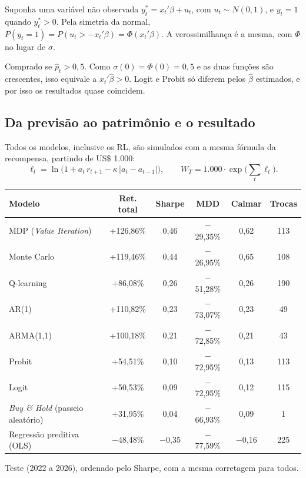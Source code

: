 \documentclass[11pt,a4paper]{article}
\newcommand{\bloco}[1]{\par\needspace{4\baselineskip}{\bfseries #1}\par\nopagebreak}
\begin{document}
\bloco{Probit}
Suponha uma variável não observada $y_t^* = x_t'\beta + u_t$, com $u_t \sim N(0,1)$, e $y_t = 1$ quando $y_t^* > 0$. Pela simetria da normal, $P(y_t = 1) = P(u_t > -x_t'\beta) = \Phi(x_t'\beta)$. A verossimilhança é a mesma, com $\Phi$ no lugar de $\sigma$.

\bloco{Decisão}
Comprado se $\hat p_t > 0{,}5$. Como $\sigma(0) = \Phi(0) = 0{,}5$ e as duas funções são crescentes, isso equivale a $x_t'\hat\beta > 0$. Logit e Probit só diferem pelos $\hat\beta$ estimados, e por isso os resultados quase coincidem.

\subsection{Da previsão ao patrimônio e o resultado}

Todos os modelos, inclusive os RL, são simulados com a mesma fórmula da recompensa, partindo de US\$ 1.000:
\[
  \ell_t = \ln\big(1 + a_t\, r_{t+1} - \kappa\,|a_t - a_{t-1}|\big), \qquad W_T = 1.000 \cdot \exp\Big(\sum_t \ell_t\Big).
\]

\begin{center}
\small
\setlength{\tabcolsep}{5pt}
\begin{tabular}{l ccccc}
  \toprule
  \textbf{Modelo} & \textbf{Ret. total} & \textbf{Sharpe} & \textbf{MDD} & \textbf{Calmar} & \textbf{Trocas} \\
  \midrule
  MDP (\textit{Value Iteration})           & +126,86\% & 0,46    & $-$29,35\% & 0,62    & 113 \\
  Monte Carlo                              & +119,46\% & 0,44    & $-$26,95\% & 0,65    & 108 \\
  Q-learning                               & +86,08\%  & 0,26    & $-$51,28\% & 0,26    & 190 \\
  \midrule
  AR(1)                                    & +110,82\% & 0,23    & $-$73,07\% & 0,23    & 49  \\
  ARMA(1,1)                                & +100,18\% & 0,21    & $-$72,85\% & 0,21    & 43  \\
  Probit                                   & +54,51\%  & 0,10    & $-$72,95\% & 0,13    & 113 \\
  Logit                                    & +50,53\%  & 0,09    & $-$72,95\% & 0,12    & 115 \\
  \textit{Buy \& Hold} (passeio aleatório) & +31,95\%  & 0,04    & $-$66,93\% & 0,09    & 1   \\
  Regressão preditiva (OLS)                & $-$48,48\% & $-$0,35 & $-$77,59\% & $-$0,16 & 225 \\
  \bottomrule
\end{tabular}

\smallskip
{\footnotesize Teste (2022 a 2026), ordenado pelo Sharpe, com a mesma corretagem para todos.}
\end{center}
\end{document}
